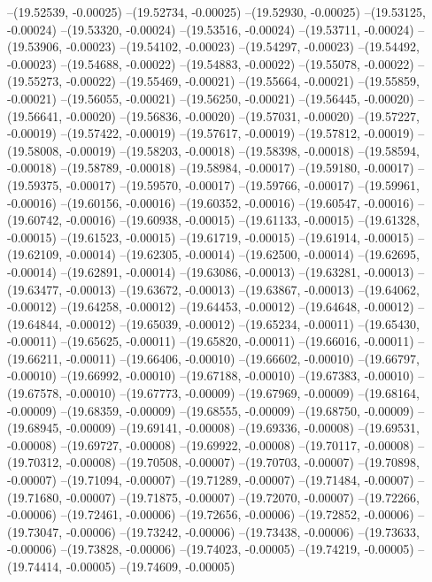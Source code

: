 --(19.52539, -0.00025)
--(19.52734, -0.00025)
--(19.52930, -0.00025)
--(19.53125, -0.00024)
--(19.53320, -0.00024)
--(19.53516, -0.00024)
--(19.53711, -0.00024)
--(19.53906, -0.00023)
--(19.54102, -0.00023)
--(19.54297, -0.00023)
--(19.54492, -0.00023)
--(19.54688, -0.00022)
--(19.54883, -0.00022)
--(19.55078, -0.00022)
--(19.55273, -0.00022)
--(19.55469, -0.00021)
--(19.55664, -0.00021)
--(19.55859, -0.00021)
--(19.56055, -0.00021)
--(19.56250, -0.00021)
--(19.56445, -0.00020)
--(19.56641, -0.00020)
--(19.56836, -0.00020)
--(19.57031, -0.00020)
--(19.57227, -0.00019)
--(19.57422, -0.00019)
--(19.57617, -0.00019)
--(19.57812, -0.00019)
--(19.58008, -0.00019)
--(19.58203, -0.00018)
--(19.58398, -0.00018)
--(19.58594, -0.00018)
--(19.58789, -0.00018)
--(19.58984, -0.00017)
--(19.59180, -0.00017)
--(19.59375, -0.00017)
--(19.59570, -0.00017)
--(19.59766, -0.00017)
--(19.59961, -0.00016)
--(19.60156, -0.00016)
--(19.60352, -0.00016)
--(19.60547, -0.00016)
--(19.60742, -0.00016)
--(19.60938, -0.00015)
--(19.61133, -0.00015)
--(19.61328, -0.00015)
--(19.61523, -0.00015)
--(19.61719, -0.00015)
--(19.61914, -0.00015)
--(19.62109, -0.00014)
--(19.62305, -0.00014)
--(19.62500, -0.00014)
--(19.62695, -0.00014)
--(19.62891, -0.00014)
--(19.63086, -0.00013)
--(19.63281, -0.00013)
--(19.63477, -0.00013)
--(19.63672, -0.00013)
--(19.63867, -0.00013)
--(19.64062, -0.00012)
--(19.64258, -0.00012)
--(19.64453, -0.00012)
--(19.64648, -0.00012)
--(19.64844, -0.00012)
--(19.65039, -0.00012)
--(19.65234, -0.00011)
--(19.65430, -0.00011)
--(19.65625, -0.00011)
--(19.65820, -0.00011)
--(19.66016, -0.00011)
--(19.66211, -0.00011)
--(19.66406, -0.00010)
--(19.66602, -0.00010)
--(19.66797, -0.00010)
--(19.66992, -0.00010)
--(19.67188, -0.00010)
--(19.67383, -0.00010)
--(19.67578, -0.00010)
--(19.67773, -0.00009)
--(19.67969, -0.00009)
--(19.68164, -0.00009)
--(19.68359, -0.00009)
--(19.68555, -0.00009)
--(19.68750, -0.00009)
--(19.68945, -0.00009)
--(19.69141, -0.00008)
--(19.69336, -0.00008)
--(19.69531, -0.00008)
--(19.69727, -0.00008)
--(19.69922, -0.00008)
--(19.70117, -0.00008)
--(19.70312, -0.00008)
--(19.70508, -0.00007)
--(19.70703, -0.00007)
--(19.70898, -0.00007)
--(19.71094, -0.00007)
--(19.71289, -0.00007)
--(19.71484, -0.00007)
--(19.71680, -0.00007)
--(19.71875, -0.00007)
--(19.72070, -0.00007)
--(19.72266, -0.00006)
--(19.72461, -0.00006)
--(19.72656, -0.00006)
--(19.72852, -0.00006)
--(19.73047, -0.00006)
--(19.73242, -0.00006)
--(19.73438, -0.00006)
--(19.73633, -0.00006)
--(19.73828, -0.00006)
--(19.74023, -0.00005)
--(19.74219, -0.00005)
--(19.74414, -0.00005)
--(19.74609, -0.00005)
